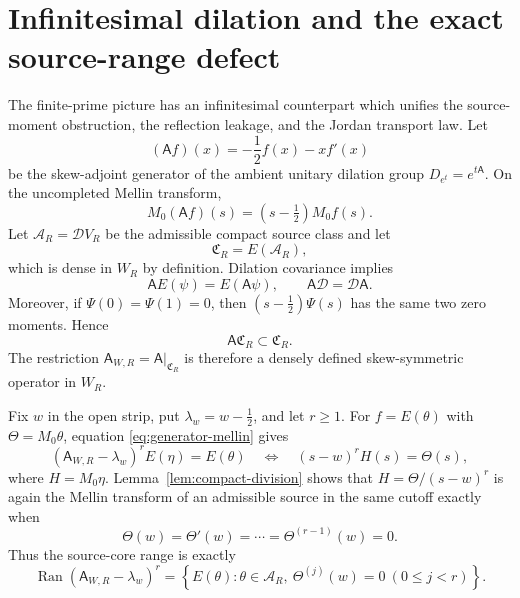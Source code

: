 \documentclass[11pt]{article}
\theoremstyle{remark}
\begin{document}
\section{Infinitesimal dilation and the exact source-range defect}
The finite-prime picture has an infinitesimal counterpart which unifies the source-moment obstruction, the reflection leakage, and the Jordan transport law.  Let
\[
 (\mathsf A f)(x)=-\frac12 f(x)-x f'(x)
\]
be the skew-adjoint generator of the ambient unitary dilation group $D_{e^t}=e^{t\mathsf A}$.  On the uncompleted Mellin transform,
\begin{equation}\label{eq:generator-mellin}
 M_0(\mathsf A f)(s)=(s-\tfrac12)M_0f(s).
\end{equation}
Let $\mathcal A_R=\mathcal D V_R$ be the admissible compact source class and let
\[
 \mathfrak C_R=E(\mathcal A_R),
\]
which is dense in $W_R$ by definition.  Dilation covariance implies
\[
 \mathsf A E(\psi)=E(\mathsf A\psi),
 \qquad
 \mathsf A\mathcal D=\mathcal D\mathsf A.
\]
Moreover, if $\Psi(0)=\Psi(1)=0$, then $(s-\tfrac12)\Psi(s)$ has the same two zero moments.  Hence
\begin{equation}\label{eq:generator-core-invariance}
 \boxed{\mathsf A\mathfrak C_R\subset\mathfrak C_R.}
\end{equation}
The restriction $\mathsf A_{W,R}=\mathsf A|_{\mathfrak C_R}$ is therefore a densely defined skew-symmetric operator in $W_R$.

Fix $w$ in the open strip, put $\lambda_w=w-\tfrac12$, and let $r\ge1$.  For $f=E(\theta)$ with $\Theta=M_0\theta$, equation \eqref{eq:generator-mellin} gives
\[
 (\mathsf A_{W,R}-\lambda_w)^r E(\eta)=E(\theta)
 \quad\Longleftrightarrow\quad
 (s-w)^r H(s)=\Theta(s),
\]
where $H=M_0\eta$.  Lemma~\ref{lem:compact-division} shows that $H=\Theta/(s-w)^r$ is again the Mellin transform of an admissible source in the same cutoff exactly when
\[
 \Theta(w)=\Theta'(w)=\cdots=\Theta^{(r-1)}(w)=0.
\]
Thus the source-core range is exactly
\begin{equation}\label{eq:generator-range-core}
 \operatorname{Ran}(\mathsf A_{W,R}-\lambda_w)^r
 =\left\{E(\theta):\theta\in\mathcal A_R,\ \Theta^{(j)}(w)=0\ (0\le j<r)\right\}.
\end{equation}
\end{document}
